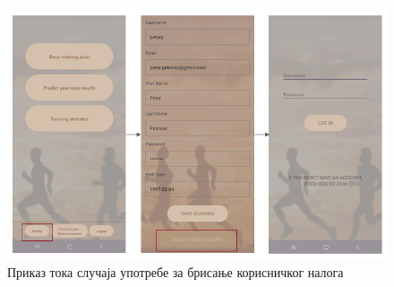 \documentclass[12pt,oneside]{memoir}
\begin{document}
\begin{figure}[H]
  \centering
  \includegraphics[scale=0.9]{assets/pictures/usecases_flows/delete_account_flow.png}
    \caption{Приказ тока случаја употребе за брисање корисничког налога}
  \label{pic:delete-account-flow}
\end{figure}

\newpage
\end{document}
